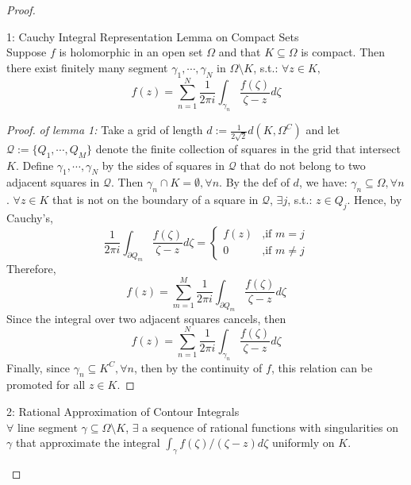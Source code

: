 \begin{proof}
    \begin{lemma}{1: Cauchy Integral Representation Lemma on Compact Sets}\\
    Suppose $f$ is holomorphic in an open set $\Omega$ and that $K\subseteq \Omega$ is compact. Then there exist finitely many segment $\gamma_1 ,\cdots, \gamma_N$ in $\Omega \setminus K$, s.t.: $\forall z\in K,$
    \[
    f(z)=\sum_{n=1}^N \frac{1}{2\pi i} \int_{\gamma_n} \frac{f(\zeta)}{\zeta-z} d\zeta
    \]
    \end{lemma}

    \begin{proof}
        \textit{of lemma 1:} Take a grid of length $d:= \frac{1}{2\sqrt{2}} d(K,\Omega^C)$ and let $\mathcal{Q}:= \{ Q_1 ,\cdots, Q_M\}$ denote the finite collection of squares in the grid that intersect $K$. Define $\gamma_1 ,\cdots, \gamma_N$ by the sides of squares in $\mathcal{Q}$ that do not belong to two adjacent squares in $\mathcal{Q}$. Then $\gamma_n \cap K= \emptyset ,\forall n$. By the def of $d$, we have: $\gamma_n \subseteq \Omega, \forall n$. $\forall z\in K$ that is not on the boundary of a square in $\mathcal{Q}$, $\exists j$, s.t.: $z\in Q_j$. Hence, by Cauchy's,
        \[
        \frac{1}{2\pi i} \int_{\partial Q_m} \frac{f(\zeta)}{\zeta -z} d\zeta= \begin{cases}
            f(z) &\text{,if }m=j\\
            0&\text{,if }m\neq j
        \end{cases}
        \]
        Therefore, 
        \[
        f(z)= \sum_{m=1}^M \frac{1}{2\pi i} \int_{\partial Q_m} \frac{f(\zeta)}{\zeta -z} d\zeta
        \]
        Since the integral over two adjacent squares cancels, then
        \[
        f(z)=\sum_{n=1}^N \frac{1}{2\pi i} \int_{\gamma_n} \frac{f(\zeta)}{\zeta -z} d\zeta
        \]
        Finally, since $\gamma_n\subseteq K^C, \forall n$, then by the continuity of $f$, this relation can be promoted for all $z\in K$.
    \end{proof}

    \begin{lemma}{2: Rational Approximation of Contour Integrals}\\
    $\forall$ line segment $\gamma \subseteq \Omega \setminus K$, $\exists$ a sequence of rational functions with singularities on $\gamma$ that approximate the integral $\int_\gamma f(\zeta)/ (\zeta-z) d\zeta$ uniformly on $K$.
    \end{lemma}


\end{proof}
